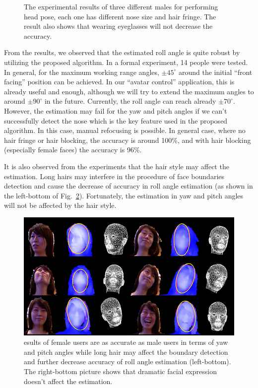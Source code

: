 \begin{figure}
\caption{The experimental results of three different males for performing head pose, each one has different nose size and hair fringe. The result also shows that wearing eyeglasses will not decrease the accuracy.}
\label{fig:12}       %
\end{figure}

From the results, we observed that the estimated roll angle is quite robust by utilizing the proposed algorithm. In a formal experiment, 14 people were tested. In general, for the maximum working range angles, $\pm 45^{\circ}$ around the initial “front facing” position can be achieved. In our “avatar control” application, this is already useful and enough, although we will try to extend the maximum angles to around $\pm 90^{\circ}$ in the future. Currently, the roll angle can reach already $\pm 70^{\circ}$. However, the estimation may fail for the yaw and pitch angles if we can’t successfully detect the nose which is the key feature used in the proposed algorithm. In this case, manual refocusing is possible. In general case, where no hair fringe or hair blocking, the accuracy is around 100\%, and with hair blocking (especially female faces) the accuracy is 96\%.

It is also observed from the experiments that the hair style may affect the estimation. Long hairs may interfere in the procedure of face boundaries detection and cause the decrease of accuracy in roll angle estimation (as shown in the left-bottom of Fig.~\ref{fig:13}). Fortunately, the estimation in yaw and pitch angles will not be affected by the hair style.

\begin{figure}
\includegraphics[width=1.0\linewidth]{./fig13.png}
\caption{esults of female users are as accurate as male users in terms of yaw and pitch angles while long hair may affect the boundary detection and further decrease accuracy of roll angle estimation (left-bottom). The right-bottom picture shows that dramatic facial expression doesn’t affect the estimation.}
\label{fig:13}       %
\end{figure}

